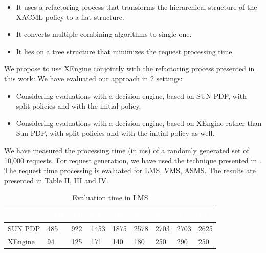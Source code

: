 \begin{itemize}
\item It uses a refactoring process that transforms the hierarchical structure of the XACML policy to a flat structure. 
\item It converts multiple combining algorithms to single one.
\item It lies on a tree structure that minimizes the request processing time.
\end{itemize}
We propose to use XEngine conjointly with the refactoring process presented in this work:
We have evaluated our approach in 2 settings:
\begin{itemize}
\item Considering evaluations with a decision engine, based on SUN PDP, with split policies and with the initial policy.  
\item Considering evaluations with a decision engine, based on XEngine rather than Sun PDP, with split policies and with the initial policy as well.  
\end{itemize}
We have measured the processing time (in ms) of a randomly generated set of 10,000 requests. For request generation, we have used the technique presented 
in \cite{request}. The request time processing is evaluated for LMS, VMS, ASMS. The results are presented in Table II, III and IV.


\begin{table}[h!]
\small


\begin{tabular}{|>{\small}l|>{\small}l|>{\small}l|>{\small}l|>{\small}l|>{\small}l|>{\small}l|>{\small}l|>{\small}l|}  
\hline  \rowcolor{black} \scriptsize \bf \textcolor {white}{}
& \scriptsize \bf \textcolor {white}{SAR}
& \scriptsize \bf \textcolor {white}{AR}
& \scriptsize \bf \textcolor  {white}{SA}
& \scriptsize \bf \textcolor  {white}{SR}
& \scriptsize \bf \textcolor  {white}{R}

& \scriptsize \bf \textcolor  {white}{S} 
& \scriptsize \bf \textcolor  {white}{A}
& \scriptsize \bf \textcolor {white}{IA}\\ \hline
\scriptsize  {SUN PDP}
&\scriptsize  {485}
& \scriptsize {922}
& \scriptsize {1453}
& \scriptsize {1875}
& \scriptsize {2578}

& \scriptsize {2703}
& \scriptsize {2703}
& \scriptsize {2625}
  \\ \hline
\scriptsize  {XEngine}
&\scriptsize  {94}
& \scriptsize {125}
& \scriptsize {171}
& \scriptsize {140}
& \scriptsize {180}

& \scriptsize {250}
& \scriptsize {290}
& \scriptsize {250}
  \\ \hline
\end{tabular}
\caption{Evaluation time in LMS}\end{table}



